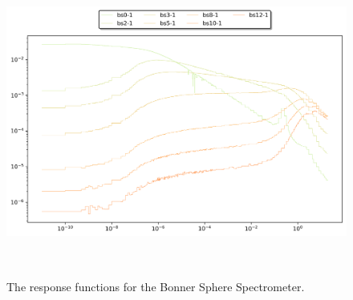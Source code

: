 
\begin{figure}[htb]
\centering
\includegraphics[height=4in]{tex/figures/bs.png}
\caption[Bonner Sphere Spectrometer Response Functions]{The response functions for the Bonner Sphere Spectrometer.}
\label{fig:bs_rfs}
\end{figure}


